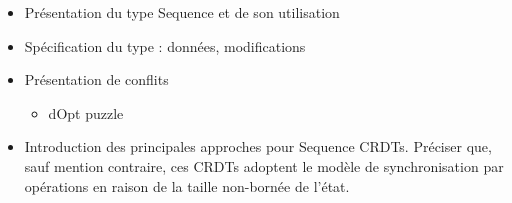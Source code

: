 \begin{itemize}
  \item Présentation du type Sequence et de son utilisation
  \item Spécification du type : données, modifications
  \item Présentation de conflits
  \begin{itemize}
    \item dOpt puzzle
  \end{itemize}
  \item Introduction des principales approches pour Sequence \acp{CRDT}.
    Préciser que, sauf mention contraire, ces \acp{CRDT} adoptent le modèle de synchronisation par opérations en raison de la taille non-bornée de l'état.
\end{itemize}
